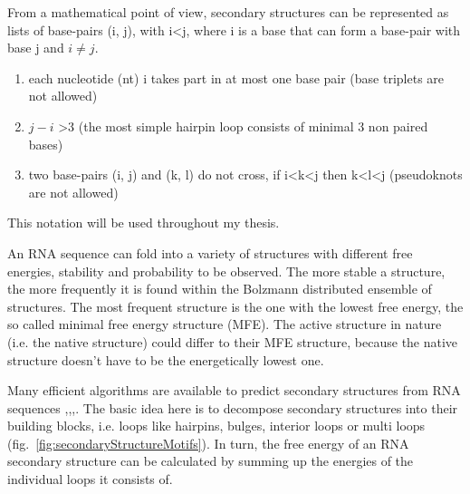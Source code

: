 \documentclass[ twoside,openright,titlepage,numbers=noenddot,headinclude,%
                footinclude=false, cleardoublepage=empty,abstractoff, %
                BCOR=5mm,paper=a4,fontsize=11pt,%
                ngerman,american,%
                ]{scrreprt}
\begin{document}
\FloatBarrier
From a mathematical point of view, secondary structures can be represented as lists of base-pairs (i, j), with
i\textless j, where i is a base that can form a base-pair with base j and $i\not=j$\citep{waterman1978}.
\begin{enumerate}
	\item each nucleotide (nt) i takes part in at most one base pair (base triplets are not allowed)
	\item $j- i$ \textgreater 3 (the most simple hairpin loop consists of minimal 3 non paired bases)
	\item two base-pairs (i, j) and (k, l) do not cross, if i\textless k\textless j then k\textless l\textless j (pseudoknots are not allowed)
\end{enumerate}
This notation will be used throughout my thesis.





An RNA sequence can fold into a variety of structures with different free
energies, stability and probability to be observed.
The more stable a structure, the more frequently it is found within the
Bolzmann distributed ensemble of structures. The most frequent structure is
the one with the lowest free energy, the so called minimal free energy
structure (MFE).
The active structure in nature (i.e. the native structure) could differ to their MFE structure, because the
native structure doesn't have to be the energetically lowest one.


Many efficient algorithms are available to predict secondary structures
from RNA sequences \citep{hofacker:1994},\citep{ViennaRNA},\citep{Mfold},\citep{Contrafold}. The basic idea here is to 
decompose secondary structures into their building blocks, i.e. loops like
hairpins, bulges, interior loops or multi loops (fig.~\ref{fig:secondaryStructureMotifs}).
In turn, the free energy of an RNA secondary structure can be calculated by
summing up the energies of the individual loops it consists of.
\end{document}
